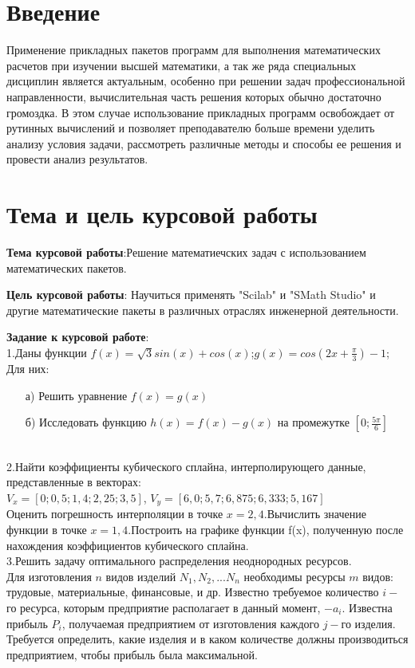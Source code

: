 \documentclass[russian,utf8,nocolumnxxxi,nocolumnxxxii]{eskdtext}
\begin{document}
\maketitle

\newpage
\tableofcontents

\newpage
\section{Введение}
Применение прикладных пакетов программ для выполнения математических расчетов при изучении высшей математики, а так же ряда специальных дисциплин является актуальным, особенно при решении задач профессиональной направленности, вычислительная часть решения которых обычно достаточно громоздка. В этом случае использование прикладных программ освобождает от рутинных вычислений и позволяет преподавателю больше времени уделить анализу условия задачи, рассмотреть различные методы и способы ее решения и провести анализ результатов.
\newpage
\section{Тема и цель курсовой работы}
\textbf{Тема курсовой работы}:Решение математиечских задач с использованием математических пакетов.

\textbf{Цель курсовой работы}: Научиться применять "Scilab" и "SMath Studio" и другие математические пакеты в различных отраслях инженерной деятельности.

\textbf{Задание к курсовой работе}:
\\1.Даны функции $f(x)=\sqrt{3}sin(x)+cos(x)$;$g(x)=cos(2x+\frac{\pi}{3})-1$;
\\Для них:
\begin{enumerate}
    \item[а)]Решить уравнение $f(x)=g(x)$
    \item[б)]Исследовать функцию $h(x)=f(x)-g(x)$ на промежутке $[0;\frac{5\pi}{6}]$
\end{enumerate}
\\2.Найти коэффициенты кубического сплайна, интерполирующего данные, представленные в векторах:\\
$V_{x}=[0;0,5;1,4;2,25;3,5]$,
$V_{y}=[6,0;5,7;6,875;6,333;5,167]$\\
Оценить погрешность интерполяции в точке $x=2,4$.Вычислить значение функции в точке $x=1,4$.Построить на графике функции f(x), полученную после нахождения коэффициентов кубического сплайна.\\
3.Решить задачу оптимального распределения неоднородных ресурсов.\\
Для изготовления $n$ видов изделий $N_1,N_2,...N_n$ необходимы ресурсы $m$ видов: трудовые, материальные, финансовые, и др. Известно требуемое количество $i-$го ресурса, которым предприятие располагает в данный момент, $-a_i$. Известна прибыль $P_i$, получаемая предприятием от изготовления каждого $j-$го изделия. Требуется определить, какие изделия и в каком количестве должны производиться предприятием, чтобы прибыль была максимальной.
\end{document}
